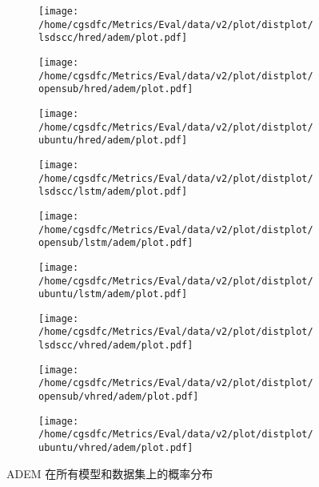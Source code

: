 \begin{figure}%
\centering%
\begin{subfigure}{0.3333333333333333\linewidth}%
\centering%
\texttt{[image: /home/cgsdfc/Metrics/Eval/data/v2/plot/distplot/lsdscc/hred/adem/plot.pdf]}%
\end{subfigure}%
\begin{subfigure}{0.3333333333333333\linewidth}%
\centering%
\texttt{[image: /home/cgsdfc/Metrics/Eval/data/v2/plot/distplot/opensub/hred/adem/plot.pdf]}%
\end{subfigure}%
\begin{subfigure}{0.3333333333333333\linewidth}%
\centering%
\texttt{[image: /home/cgsdfc/Metrics/Eval/data/v2/plot/distplot/ubuntu/hred/adem/plot.pdf]}%
\end{subfigure}%
\newline%
\begin{subfigure}{0.3333333333333333\linewidth}%
\centering%
\texttt{[image: /home/cgsdfc/Metrics/Eval/data/v2/plot/distplot/lsdscc/lstm/adem/plot.pdf]}%
\end{subfigure}%
\begin{subfigure}{0.3333333333333333\linewidth}%
\centering%
\texttt{[image: /home/cgsdfc/Metrics/Eval/data/v2/plot/distplot/opensub/lstm/adem/plot.pdf]}%
\end{subfigure}%
\begin{subfigure}{0.3333333333333333\linewidth}%
\centering%
\texttt{[image: /home/cgsdfc/Metrics/Eval/data/v2/plot/distplot/ubuntu/lstm/adem/plot.pdf]}%
\end{subfigure}%
\newline%
\begin{subfigure}{0.3333333333333333\linewidth}%
\centering%
\texttt{[image: /home/cgsdfc/Metrics/Eval/data/v2/plot/distplot/lsdscc/vhred/adem/plot.pdf]}%
\end{subfigure}%
\begin{subfigure}{0.3333333333333333\linewidth}%
\centering%
\texttt{[image: /home/cgsdfc/Metrics/Eval/data/v2/plot/distplot/opensub/vhred/adem/plot.pdf]}%
\end{subfigure}%
\begin{subfigure}{0.3333333333333333\linewidth}%
\centering%
\texttt{[image: /home/cgsdfc/Metrics/Eval/data/v2/plot/distplot/ubuntu/vhred/adem/plot.pdf]}%
\end{subfigure}%
\caption{ADEM 在所有模型和数据集上的概率分布}%
\label{fig:ADEM{-}dist{-}all}%
\end{figure}